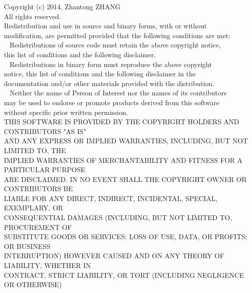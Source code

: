 {\ttfamily\raggedright
Copyright (c) 2014, Zhantong ZHANG \\
All rights reserved. \\
\vspace{1\baselineskip}\vspace{-\parskip}
Redistribution and use in source and binary forms, with or without \\
modification, are permitted provided that the following conditions are met: \\
\vspace{1\baselineskip}\vspace{-\parskip}
\ \* Redistributions of source code must retain the above copyright notice, \\
   this list of conditions and the following disclaimer. \\
\ \* Redistributions in binary form must reproduce the above copyright \\
   notice, this list of conditions and the following disclaimer in the \\
   documentation and/or other materials provided with the distribution. \\
\ \* Neither the name of Person of Interest nor the names of its contributors \\
   may be used to endorse or promote products derived from this software \\
   without specific prior written permission. \\
\vspace{1\baselineskip}\vspace{-\parskip}
THIS SOFTWARE IS PROVIDED BY THE COPYRIGHT HOLDERS AND CONTRIBUTORS "AS IS" \\
AND ANY EXPRESS OR IMPLIED WARRANTIES, INCLUDING, BUT NOT LIMITED TO, THE \\
IMPLIED WARRANTIES OF MERCHANTABILITY AND FITNESS FOR A PARTICULAR PURPOSE \\
ARE DISCLAIMED. IN NO EVENT SHALL THE COPYRIGHT OWNER OR CONTRIBUTORS BE \\
LIABLE FOR ANY DIRECT, INDIRECT, INCIDENTAL, SPECIAL, EXEMPLARY, OR \\
CONSEQUENTIAL DAMAGES (INCLUDING, BUT NOT LIMITED TO, PROCUREMENT OF \\
SUBSTITUTE GOODS OR SERVICES; LOSS OF USE, DATA, OR PROFITS; OR BUSINESS \\
INTERRUPTION) HOWEVER CAUSED AND ON ANY THEORY OF LIABILITY, WHETHER IN \\
CONTRACT, STRICT LIABILITY, OR TORT (INCLUDING NEGLIGENCE OR OTHERWISE) \\
}
